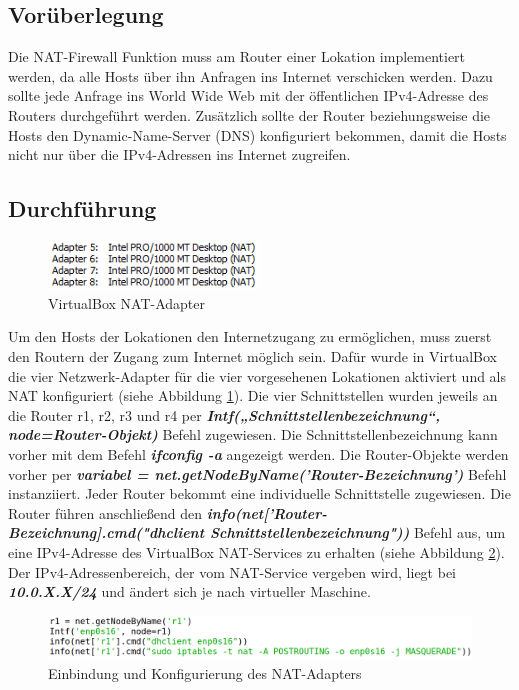 \documentclass[fontsize=12pt,paper=a4,open=any,parskip=half,
  twoside=false,toc=listof,toc=bibliography,fleqn,leqno,
  captions=nooneline,captions=tableabove,british]{scrbook}
\begin{document}
\subsection{Vorüberlegung}
Die NAT-Firewall Funktion muss am Router einer Lokation implementiert werden, da alle Hosts über ihn Anfragen ins Internet verschicken werden. Dazu sollte jede Anfrage ins World Wide Web mit der öffentlichen IPv4-Adresse des Routers durchgeführt werden. Zusätzlich sollte der Router beziehungsweise die Hosts den Dynamic-Name-Server (DNS) konfiguriert bekommen, damit die Hosts nicht nur über die IPv4-Adressen ins Internet zugreifen.

\subsection{Durchführung}
\begin{figure}
 \centering
 \includegraphics[width=0.5\textwidth]{Bilder/adapter}
 \captionsetup{justification=centering}
 \caption{VirtualBox NAT-Adapter}
 \label{adapter}
\end{figure}

Um den Hosts der Lokationen den Internetzugang zu ermöglichen, muss zuerst den Routern der Zugang zum Internet möglich sein. Dafür wurde in VirtualBox die vier Netzwerk-Adapter für die vier vorgesehenen Lokationen aktiviert und als NAT konfiguriert (siehe Abbildung \ref{adapter}). 
Die vier Schnittstellen wurden jeweils an die Router r1, r2, r3 und r4 per \textit{\textbf{Intf(„Schnittstellenbezeichnung“, node=Router-Objekt)}} Befehl zugewiesen. Die Schnittstellenbezeichnung kann vorher mit dem Befehl \textit{\textbf{ifconfig -a}} angezeigt werden. Die Router-Objekte werden vorher per \textit{\textbf{variabel = net.getNodeByName('Router-Bezeichnung')}} Befehl instanziiert. Jeder Router bekommt eine individuelle Schnittstelle zugewiesen. Die Router führen anschließend den \textit{\textbf{info(net['Router-Bezeichnung].cmd("dhclient Schnittstellenbezeichnung"))}} Befehl aus, um eine IPv4-Adresse des VirtualBox NAT-Services zu erhalten (siehe Abbildung \ref{interface}). Der IPv4-Adressenbereich, der vom NAT-Service vergeben wird, liegt bei \textit{\textbf{10.0.X.X/24}} und ändert sich je nach virtueller Maschine.

\begin{figure}[H]
 \centering
 \includegraphics[width=1.0\textwidth]{Bilder/interface}
 \captionsetup{justification=centering,margin=2cm}
 \caption{Einbindung und Konfigurierung des NAT-Adapters}
 \label{interface}
\end{figure}
\end{document}
